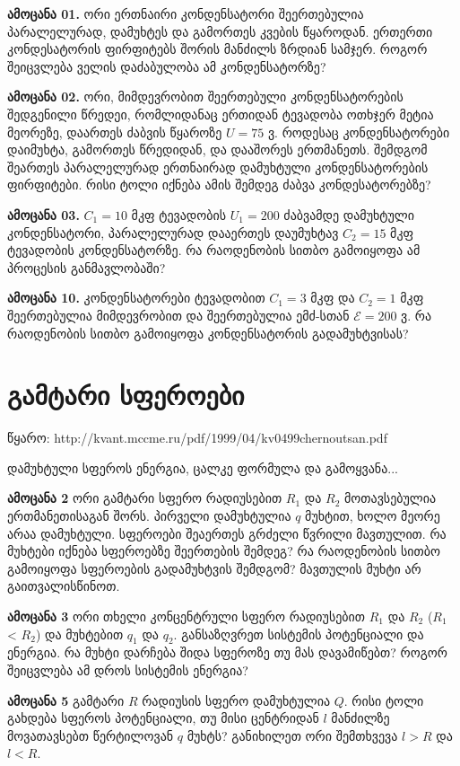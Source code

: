 \documentclass{book}
\begin{document}
\textbf{ამოცანა 01.} ორი ერთნაირი კონდენსატორი შეერთებულია პარალელურად, დამუხტეს და გამორთეს კვების წყაროდან. ერთერთი კონდესატორის ფირფიტებს შორის მანძილს ზრდიან სამჯერ. როგორ შეიცვლება ველის დაძაბულობა ამ კონდენსატორზე?

\textbf{ამოცანა 02.} ორი, მიმდევრობით შეერთებული კონდენსატორების შედგენილი წრედეი, რომლიდანაც ერთიდან ტევადობა ოთხჯერ მეტია მეორეზე, დაართეს ძაბვის წყაროზე $U = 75$ ვ. როდესაც კონდენსატორები დაიმუხტა, გამორთეს წრედიდან, და დააშორეს ერთმანეთს. შემდგომ შეართეს პარალელურად ერთნაირად დამუხტული კონდენსატორების ფირფიტები. რისი ტოლი იქნება ამის შემდეგ ძაბვა კონდესატორებზე?

\textbf{ამოცანა 03.} $C_1 = 10$ მკფ ტევადობის $U_1=200$ ძაბვამდე დამუხტული კონდენსატორი, პარალელურად დააერთეს დაუმუხტავ $C_2 = 15$ მკფ ტევადობის კონდენსატორზე. რა რაოდენობის სითბო გამოიყოფა ამ პროცესის განმავლობაში?

\textbf{ამოცანა 10.} კონდენსატორები ტევადობით $C_1=3$ მკფ და $C_2=1$ მკფ შეერთებულია მიმდევრობით და შეერთებულია ემძ-სთან $\mathcal{E} = 200$ ვ. რა რაოდენობის სითბო გამოიყოფა კონდენსატორის გადამუხტვისას?

\section{გამტარი სფეროები}
წყარო: http://kvant.mccme.ru/pdf/1999/04/kv0499chernoutsan.pdf


დამუხტული სფეროს ენერგია, ცალკე ფორმულა და გამოყვანა...

\textbf{ამოცანა 2} ორი გამტარი სფერო რადიუსებით $R_1$ და $R_2$ მოთავსებულია ერთმანეთისაგან შორს. პირველი დამუხტულია $q$ მუხტით, ხოლო მეორე არაა დამუხტული. სფეროები შეაერთეს გრძელი წვრილი მავთულით. რა მუხტები იქნება სფეროებზე შეერთების შემდეგ? რა რაოდენობის სითბო გამოიყოფა სფეროების გადამუხტვის შემდგომ? მავთულის მუხტი არ გაითვალისწინოთ.

\textbf{ამოცანა 3} ორი თხელი კონცენტრული სფერო რადიუსებით $R_1$ და $R_2$ ($R_1$ < $R_2$) და მუხტებით $q_1$ და $q_2$. განსაზღვრეთ სისტემის პოტენციალი და ენერგია. რა მუხტი დარჩება შიდა სფეროზე თუ მას დავამიწებთ? როგორ შეიცვლება ამ დროს სისტემის ენერგია?

\textbf{ამოცანა 5} გამტარი $R$ რადიუსის სფერო დამუხტულია $Q$. რისი ტოლი გახდება სფეროს პოტენციალი, თუ მისი ცენტრიდან $l$ მანძილზე მოვათავსებთ წერტილოვან $q$ მუხტს? განიხილეთ ორი შემთხვევა $l > R$ და $l < R$.
\end{document}
